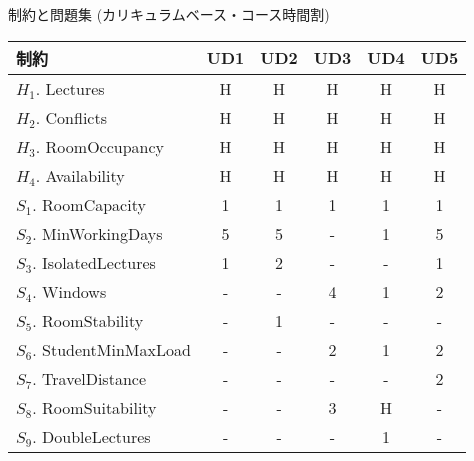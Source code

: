 \documentclass[11pt,dvipdfmx,handout]{beamer}
\begin{document}
\appendix
\begin{frame}{制約と問題集 (カリキュラムベース・コース時間割)}
  \begin{block}{}\small
    \begin{center}
      \begin{tabular}{l|ccccc}%
        制約                      &  UD1  &  UD2  &  UD3  &  UD4  &  UD5  \\
        \hline
        $H_1$. Lectures           &  H    &  H    &  H    &  H    &  H    \\
        $H_2$. Conflicts          &  H    &  H    &  H    &  H    &  H    \\
        $H_3$. RoomOccupancy      &  H    &  H    &  H    &  H    &  H    \\
        $H_4$. Availability       &  H    &  H    &  H    &  H    &  H    \\
        $S_1$. RoomCapacity       &  1    &  1    &  1    &  1    &  1    \\
        $S_2$. MinWorkingDays     &  5    &  5    &  -    &  1    &  5    \\
        $S_3$. IsolatedLectures   &  1    &  2    &  -    &  -    &  1    \\
        $S_4$. Windows            &  -    &  -    &  4    &  1    &  2    \\
        $S_5$. RoomStability      &  -    &  1    &  -    &  -    &  -    \\
        $S_6$. StudentMinMaxLoad  &  -    &  -    &  2    &  1    &  2    \\
        $S_7$. TravelDistance     &  -    &  -    &  -    &  -    &  2    \\
        $S_8$. RoomSuitability    &  -    &  -    &  3    &  H    &  -    \\
        $S_9$. DoubleLectures     &  -    &  -    &  -    &  1    &  -  
      \end{tabular}
    \end{center}
  \end{block}
\end{frame}
\end{document}
